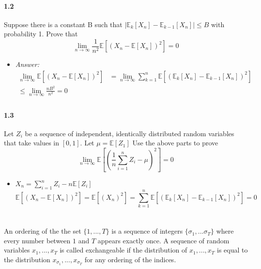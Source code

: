 \documentclass[a4paper]{article}
\begin{document}
\paragraph{1.2}
Suppose there is a constant B such that $|\mathbb{E}_k [X_n ] - \mathbb{E}_{k-1} [X_n ]| \leq B$ with probability 1.
Prove that
$$\lim_{n \rightarrow \infty} \frac{1}{n^2} \mathbb{E}[(X_n - \mathbb{E}[X_n ])^2 ] = 0$$

\begin{itemize}
    \item \emph{Answer:}
    \begin{align*}
        \lim_{n \rightarrow \infty}\mathbb{E}\!\left[(X_n - \mathbb{E}[X_n])^2\right]
        &= \lim_{n \rightarrow \infty}\sum_{k=1}^n \mathbb{E}[(\mathbb{E}_k [X_n ] - \mathbb{E}_{k-1} [X_n ])^2] \\
        \leq \lim_{n \rightarrow \infty}\frac{nB^2}{n^2} = 0 \\
    \end{align*}
\end{itemize}

\paragraph{1.3}
Let $Z_i$ be a sequence of independent, identically distributed random variables that take values in $[0, 1]$.
Let $\mu = \mathbb{E}[Z_1 ]$ Use the above parts to prove
$$\lim_{n \rightarrow \infty} \mathbb{E}\left[\left(\frac{1}{n} \sum_{i=1}^n Z_i - \mu\right)^2\right]  = 0$$

\begin{itemize}
    \item $X_n =  \sum_{i = 1}^n Z_i - n \mathbb{E}[Z_i]$
    $$\mathbb{E}[(X_n - \mathbb{E}[X_n])^2] = \mathbb{E}[(X_n)^2]= \sum_{k=1}^n \mathbb{E}[(\mathbb{E}_k [X_n ] - \mathbb{E}_{k-1} [X_n ])^2]=0$$
\end{itemize}
\section{}
An ordering of the the set $\{1, . . . , T \}$ is a sequence of integers $\{\sigma_1 , . . . \sigma_T \}$ where every number between $1$ and $T$ appears exactly once.
A sequence of random variables $x_1 , . . . , x_T$ is called exchangeable if the distribution of $x_1 , . . . , x_T$ is equal to the distribution $x_{\sigma_1}, . . . , x_{\sigma_T}$ for any ordering of the indices.
\end{document}
